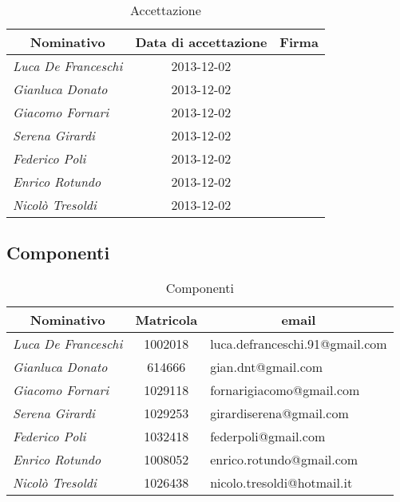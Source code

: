 	\begin{table}[h]
	\centering
	\begin{tabular}{ l c l }
	\hline
	\multicolumn{1}{c}{\textbf{Nominativo}} & \multicolumn{1}{c}{\textbf{Data di accettazione}} & \multicolumn{1}{c}{\textbf{Firma}} \\
	\hline
	\textit{Luca De Franceschi} & 2013-12-02 & \hspace{5cm} \\
	\textit{Gianluca Donato} & 2013-12-02 & \hspace{5cm} \\
	\textit{Giacomo Fornari} & 2013-12-02 & \hspace{5cm} \\
	\textit{Serena Girardi} & 2013-12-02 & \hspace{5cm} \\
	\textit{Federico Poli} & 2013-12-02 & \hspace{5cm} \\
	\textit{Enrico Rotundo} & 2013-12-02 & \hspace{5cm} \\
	\textit{Nicolò Tresoldi} & 2013-12-02 & \hspace{5cm} \\
	\hline
	\end{tabular}
	\caption{Accettazione}
	\end{table}
	
	\clearpage	
	
	\subsection{Componenti}
	
	\def\arraystretch{1.1}
	\begin{table}[h]
	\centering
	\begin{tabular}{ l c l }
	\hline
	\multicolumn{1}{c}{\textbf{Nominativo}} & \multicolumn{1}{c}{\textbf{Matricola}} & \multicolumn{1}{c}{\textbf{email}} \\
	\hline
	\textit{Luca De Franceschi} & 1002018 & luca.defranceschi.91@gmail.com \\
	\textit{Gianluca Donato} & 614666 & gian.dnt@gmail.com \\
	\textit{Giacomo Fornari} & 1029118 & fornarigiacomo@gmail.com \\
	\textit{Serena Girardi} & 1029253 & girardiserena@gmail.com \\
	\textit{Federico Poli} & 1032418 & federpoli@gmail.com \\
	\textit{Enrico Rotundo} & 1008052 & enrico.rotundo@gmail.com \\
	\textit{Nicolò Tresoldi} & 1026438 & nicolo.tresoldi@hotmail.it \\
	\hline
	\end{tabular}
	\caption{Componenti}
	\end{table}
	